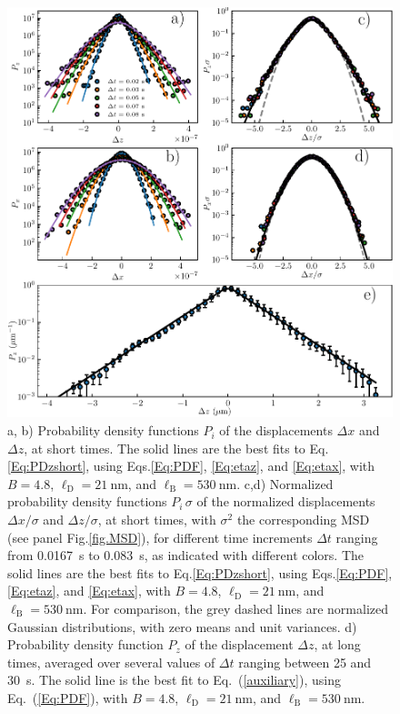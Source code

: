  \begin{figure}[H]
	\centering
	\includegraphics{02_body/chapter3/images/trajctory_analysis/P_displacement.pdf}
	\caption{a, b) Probability density functions $P_i$ of the displacements $\Delta x$ and $\Delta z$, at short times. The solid lines are the best fits to Eq.\ref{Eq:PDzshort}, using Eqs.\ref{Eq:PDF}, \ref{Eq:etaz}, and \ref{Eq:etax}, with $B = 4.8$, $\ell_\mathrm{D} = 21 ~ \mathrm{nm}$, and $\ell_\mathrm{B} = 530~\mathrm{nm}$. c,d) Normalized probability density functions $P_i\,\sigma$ of the normalized displacements $\Delta x/\sigma$ and $\Delta z/\sigma$, at short times, with $\sigma^2$ the corresponding MSD (see panel Fig.\ref{fig.MSD}), for different time increments $\Delta t$ ranging from 0.0167~s to 0.083~s, as indicated with different colors. The solid lines are the best fits to Eq.\ref{Eq:PDzshort}, using Eqs.\ref{Eq:PDF}, \ref{Eq:etaz}, and \ref{Eq:etax}, with $B = 4.8$, $\ell_\mathrm{D} = 21 ~ \mathrm{nm}$, and $\ell_\mathrm{B} = 530~\mathrm{nm}$. For comparison, the grey dashed lines are normalized Gaussian distributions, with zero means and unit variances. d) Probability density function $P_z$ of the displacement $\Delta z$, at long times, averaged over several values of $\Delta t$ ranging between 25 and 30~s. The solid line is the best fit to Eq.~(\ref{auxiliary}), using Eq.~(\ref{Eq:PDF}), with $B = 4.8$, $\ell_\mathrm{D} = 21 ~ \mathrm{nm}$, and $\ell_\mathrm{B} = 530~\mathrm{nm}$.}
	\label{fig.displacement}
\end{figure}



